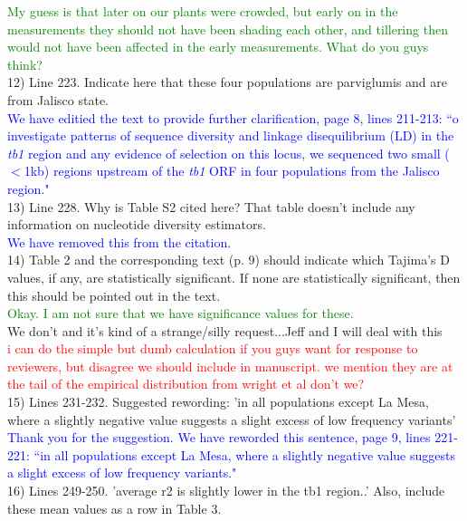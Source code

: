 \documentclass[11pt]{article}
\newcommand{\res}[1]{\noindent \textcolor{blue}{{#1}} \\}
\newcommand{\jri}[1]{\noindent \textcolor{red}{{#1}} \\}
\newcommand{\lev}[1]{\noindent \textcolor{green}{{#1}} \\}
\newcommand{\mbh}[1]{\noindent \textcolor{Dandelion}{{#1}}\\}
\begin{document}
\lev{My guess is that later on our plants were crowded, but early on in the measurements they should not have been shading each other, and tillering then would not have been affected in the early measurements. What do you guys think?}

12) Line 223. Indicate here that these four populations are parviglumis and are from Jalisco state. \\

\res{We have editied the text to provide further clarification, page 8, lines 211-213: ``o investigate patterns of sequence diversity and linkage disequilibrium (LD) in the \emph{tb1} region and any evidence of selection on this locus, we sequenced two small ($<$1kb) regions upstream of the \emph{tb1} ORF in four populations from the Jalisco region."}

13) Line 228. Why is Table S2 cited here? That table doesn't include any information on nucleotide diversity estimators.\\

\res{We have removed this from the citation.}

14) Table 2 and the corresponding text (p. 9) should indicate which Tajima's D values, if any, are statistically significant. If none are statistically significant, then this should be pointed out in the text. \\

\lev{Okay. I am not sure that we have significance values for these.}

\mbh{We don't and it's kind of a strange/silly request...Jeff and I will deal with this}
\jri{ i can do the simple but dumb calculation if you guys want for response to reviewers, but disagree we should include in manuscript. we mention they are at the tail of the empirical distribution from wright et al don't we?}

15) Lines 231-232. Suggested rewording: 'in all populations except La Mesa, where a slightly negative value suggests a slight excess of low frequency variants'\\

\res{Thank you for the suggestion. We have reworded this sentence, page 9, lines 221-221: ``in all populations except La Mesa, where a slightly negative value suggests a slight excess of low frequency variants."}

16) Lines 249-250. 'average r2 is slightly lower in the tb1 region..' Also, include these mean values as a row in Table 3.\\
\end{document}
